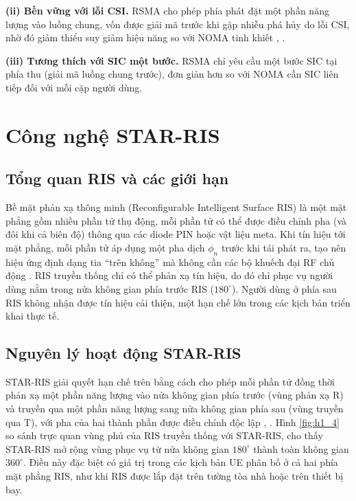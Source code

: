\textbf{(ii) Bền vững với lỗi CSI.} RSMA cho phép phía phát đặt một phần
năng lượng vào luồng chung, vốn được giải mã trước khi gặp nhiễu phá
hủy do lỗi CSI, nhờ đó giảm thiểu suy giảm hiệu năng so với NOMA tinh
khiết \cite{wu2024deep}, \cite{cernaloli2023meta}.

\textbf{(iii) Tương thích với SIC một bước.} RSMA chỉ yêu cầu một bước SIC
tại phía thu (giải mã luồng chung trước), đơn giản hơn so với NOMA cần
SIC liên tiếp đối với mỗi cặp người dùng.

\section{Công nghệ STAR-RIS}
\label{sec:starris}

\subsection{Tổng quan RIS và các giới hạn}

Bề mặt phản xạ thông minh (Reconfigurable Intelligent Surface
RIS) là một mặt phẳng gồm nhiều phần tử thụ động, mỗi phần tử có thể được
điều chỉnh pha (và đôi khi cả biên độ) thông qua các diode PIN hoặc vật
liệu meta. Khi tín hiệu tới mặt phẳng, mỗi phần tử áp dụng một pha dịch
$\phi_n$ trước khi tái phát ra, tạo nên hiệu ứng định dạng tia
``trên không'' mà không cần các bộ khuếch đại RF chủ động
\cite{wu2020smart}. RIS truyền thống chỉ có thể phản xạ tín hiệu, do đó
chỉ phục vụ người dùng nằm trong nửa không gian phía trước RIS
($180^\circ$). Người dùng ở phía sau RIS không nhận được tín hiệu cải
thiện, một hạn chế lớn trong các kịch bản triển khai thực tế.

\subsection{Nguyên lý hoạt động STAR-RIS}

STAR-RIS giải quyết hạn chế trên bằng cách cho phép mỗi phần tử
đồng thời phản xạ một phần năng lượng vào nửa không gian phía
trước (vùng phản xạ R) và truyền qua một phần năng lượng sang nửa không
gian phía sau (vùng truyền qua T), với pha của hai thành phần được điều
chỉnh độc lập \cite{liu2021starris}, \cite{mu2022simultaneously}. Hình
\ref{fig:h1_4} so sánh trực quan vùng phủ của RIS truyền thống với
STAR-RIS, cho thấy STAR-RIS mở rộng vùng phục vụ từ nửa không gian
$180^\circ$ thành toàn không gian $360^\circ$. Điều này đặc biệt có giá
trị trong các kịch bản UE phân bố ở cả hai phía mặt phẳng RIS, như khi
RIS được lắp đặt trên tường tòa nhà hoặc trên thiết bị bay.

